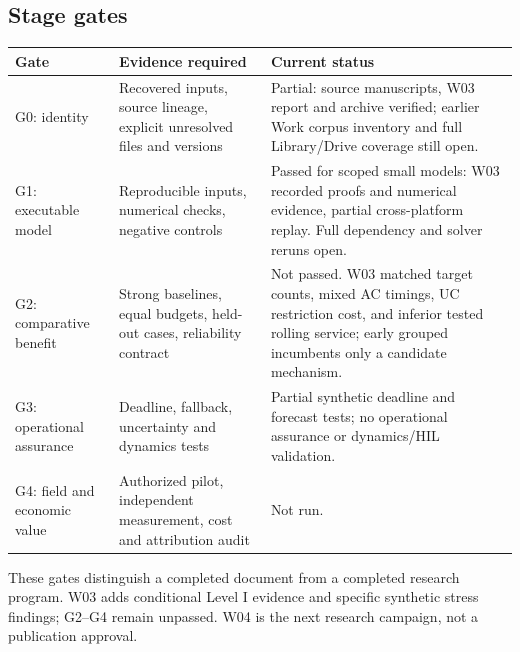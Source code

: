 \documentclass[11pt,letterpaper]{article}
\begin{document}
\subsection{Stage gates}
\begin{longtable}{P{.17\linewidth}P{.44\linewidth}P{.30\linewidth}}
\toprule Gate & Evidence required & Current status\\\midrule\endhead
G0: identity & Recovered inputs, source lineage, explicit unresolved files and versions & Partial: source manuscripts, W03 report and archive verified; earlier Work corpus inventory and full Library/Drive coverage still open.\\
G1: executable model & Reproducible inputs, numerical checks, negative controls & Passed for scoped small models: W03 recorded proofs and numerical evidence, partial cross-platform replay. Full dependency and solver reruns open.\\
G2: comparative benefit & Strong baselines, equal budgets, held-out cases, reliability contract & Not passed. W03 matched target counts, mixed AC timings, UC restriction cost, and inferior tested rolling service; early grouped incumbents only a candidate mechanism.\\
G3: operational assurance & Deadline, fallback, uncertainty and dynamics tests & Partial synthetic deadline and forecast tests; no operational assurance or dynamics/HIL validation.\\
G4: field and economic value & Authorized pilot, independent measurement, cost and attribution audit & Not run.\\
\bottomrule
\end{longtable}
These gates distinguish a completed document from a completed research program. W03 adds conditional Level I evidence and specific synthetic stress findings; G2--G4 remain unpassed. W04 is the next research campaign, not a publication approval.
\end{document}
